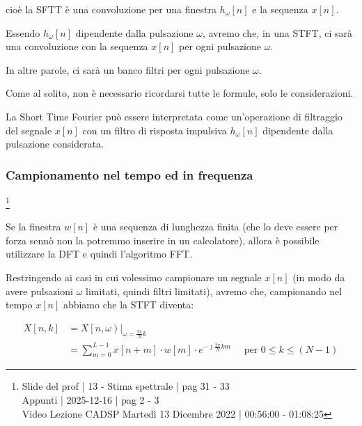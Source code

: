 cioè la SFTT è una convoluzione per una finestra $h_{\omega} \left[ n\right]$ e la sequenza $x \left[ n\right]$. \newline 

Essendo $h_{\omega} \left[ n\right]$ dipendente dalla pulsazione $\omega$, avremo che, in una STFT, ci sarà una convoluzione con la sequenza $x \left[ n\right]$ per ogni pulsazione $\omega$. \newline 

In altre parole, ci sarà un banco filtri per ogni pulsazione $\omega$. \newline 

\begin{tcolorbox}
    Come al solito, non è necessario ricordarsi tutte le formule, solo le considerazioni. 
\end{tcolorbox}

La Short Time Fourier può essere interpretata come un'operazione di filtraggio del segnale $x \left[ n\right]$ con un filtro di risposta impulsiva $h_{\omega} \left[ n\right]$ dipendente dalla pulsazione considerata. \newline 

\newpage 

\subsubsection{Campionamento nel tempo ed in frequenza}

\footnote{ 
    Slide del prof | 13 - Stima spettrale | pag 31 - 33 \\
    Appunti | 2025-12-16 | pag 2 - 3\\
    Video Lezione CADSP Martedì 13 Dicembre 2022 |  00:56:00 - 01:08:25 
}

Se la finestra $w \left[ n\right]$ è una sequenza di lunghezza finita (che lo deve essere per forza sennò non la potremmo inserire in un calcolatore), allora è possibile utilizzare la DFT e quindi l'algoritmo FFT. \newline 

Restringendo ai casi in cui volessimo campionare un segnale $x \left[ n\right]$ (in modo da avere pulsazioni $\omega$ limitati, quindi filtri limitati), 
avremo che, campionando nel tempo $x \left[ n\right]$ abbiamo che la STFT diventa: 

{
    \Large 
    \begin{equation}
        \begin{split}
            X \left[ n, k\right] 
            &= 
            \left.
            X \left[ n , \omega\right)
            \right|_{\omega = \frac{2 \pi}{N} k}
            \\
            &= 
            \sum_{m = 0}^{L - 1}
            x \left[ n + m\right]
            \cdot 
            w \left[ m\right]
            \cdot 
            e^{- \jmath \frac{2 \pi }{N} k m}
            \quad 
            \text{ per }
            0 \leq k \leq \left(N - 1\right)
        \end{split}
    \end{equation}
}

